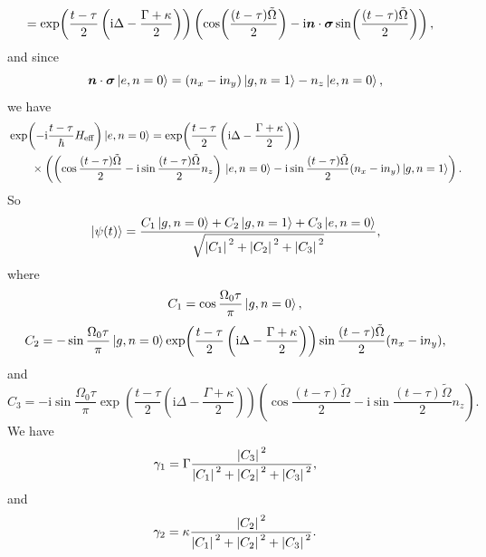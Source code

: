 \documentclass[hyperref, a4paper]{article}
\newcommand*{\ii}{\mathrm{i}}
\begin{document}
\begin{itemize}
\[\begin{aligned}
        &= \exp(\frac{t - \tau}{2} \left( \ii \Delta - \frac{\Gamma + \kappa}{2} \right)) \left( \cos(\frac{(t - \tau) \tilde{\Omega}}{2}) - \ii \vb*{n} \cdot \vb*{\sigma} \sin(\frac{(t - \tau) \tilde{\Omega}}{2}) \right),
    \end{aligned}
\]
and since 
\[
    \vb*{n} \cdot \vb*{\sigma} \ket*{e, n=0} = (n_x - \ii n_y) \ket*{g, n=1} - n_z \ket*{e, n=0},
\]
we have 
\[
    \begin{aligned}
        &\exp(- \ii \frac{t - \tau}{\hbar} H_\text{eff}) \ket*{e, n=0} = \exp(\frac{t - \tau}{2} \left( \ii \Delta - \frac{\Gamma + \kappa}{2} \right)) \\
        &\quad \quad \times \left( \left( \cos \frac{(t - \tau) \tilde{\Omega}}{2} - \ii \sin \frac{(t - \tau) \tilde{\Omega}}{2} n_z \right) \ket*{e, n=0} - \ii \sin \frac{(t - \tau) \tilde{\Omega}}{2} (n_x - \ii n_y) \ket*{g, n=1} \right). 
    \end{aligned}
\]
So 
\begin{equation}
    \ket*{\psi(t)} = \frac{C_1 \ket*{g, n=0} + C_2 \ket*{g, n=1} + C_3 \ket*{e, n=0}}{\sqrt{\abs*{C_1}^2 + \abs*{C_2}^2 + \abs*{C_3}^2}} , 
\end{equation}
where 
\begin{equation}
    C_1 =  \cos \frac{\Omega_0 \tau}{\pi} \ket*{g, n=0},
\end{equation}
\begin{equation}
    C_2 = -  \sin \frac{\Omega_0 \tau}{\pi} \ket*{g, n=0} \exp(\frac{t - \tau}{2} \left( \ii \Delta - \frac{\Gamma + \kappa}{2} \right)) \sin \frac{(t - \tau) \tilde{\Omega}}{2} (n_x - \ii n_y) ,
    \label{eq:c2}
\end{equation}
and 
\begin{equation}
    C_3 = - \ii \sin \frac{\Omega_0 \tau}{\pi} \exp(\frac{t - \tau}{2} \left( \ii \Delta - \frac{\Gamma + \kappa}{2} \right)) \left( \cos \frac{(t - \tau) \tilde{\Omega}}{2} - \ii \sin \frac{(t - \tau) \tilde{\Omega}}{2} n_z \right) .
    \label{eq:c3}
\end{equation}
We have 
\begin{equation}
    \gamma_1 = \Gamma \frac{\abs*{C_3}^2}{\abs*{C_1}^2 + \abs*{C_2}^2 + \abs*{C_3}^2},
\end{equation}
and 
\begin{equation}
    \gamma_2 = \kappa \frac{\abs*{C_2}^2}{\abs*{C_1}^2 + \abs*{C_2}^2 + \abs*{C_3}^2}.
\end{equation}


\end{itemize}
\end{document}
